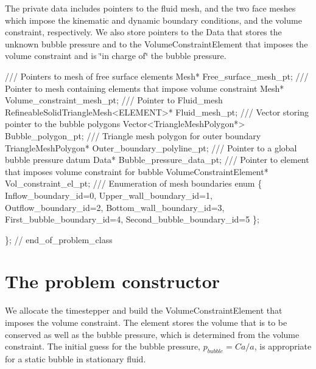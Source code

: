 The private data includes pointers to the fluid mesh, and the two face meshes which impose the kinematic and dynamic boundary conditions, and the volume constraint, respectively. We also store pointers to the Data that stores the unknown bubble pressure and to the {\ttfamily Volume\+Constraint\+Element} that imposes the volume constraint and is \char`\"{}in charge of\char`\"{} the bubble pressure.


\begin{DoxyCodeInclude}
 \textcolor{comment}{/// Pointers to mesh of free surface elements}
 Mesh* Free\_surface\_mesh\_pt;
 \textcolor{comment}{}
\textcolor{comment}{ /// Pointer to mesh containing elements that impose volume constraint}
\textcolor{comment}{} Mesh* Volume\_constraint\_mesh\_pt;
\textcolor{comment}{}
\textcolor{comment}{ /// Pointer to Fluid\_mesh}
\textcolor{comment}{} RefineableSolidTriangleMesh<ELEMENT>* Fluid\_mesh\_pt;
 \textcolor{comment}{}
\textcolor{comment}{ /// Vector storing pointer to the bubble polygons}
\textcolor{comment}{} Vector<TriangleMeshPolygon*> Bubble\_polygon\_pt;
\textcolor{comment}{}
\textcolor{comment}{ /// Triangle mesh polygon for outer boundary }
\textcolor{comment}{} TriangleMeshPolygon* Outer\_boundary\_polyline\_pt; 
\textcolor{comment}{}
\textcolor{comment}{ /// Pointer to a global bubble pressure datum}
\textcolor{comment}{} Data* Bubble\_pressure\_data\_pt;
\textcolor{comment}{}
\textcolor{comment}{ /// Pointer to element that imposes volume constraint for bubble}
\textcolor{comment}{} VolumeConstraintElement* Vol\_constraint\_el\_pt;
 \textcolor{comment}{}
\textcolor{comment}{ /// Enumeration of mesh boundaries}
\textcolor{comment}{} \textcolor{keyword}{enum} 
 \{
  Inflow\_boundary\_id=0,
  Upper\_wall\_boundary\_id=1,
  Outflow\_boundary\_id=2,
  Bottom\_wall\_boundary\_id=3,
  First\_bubble\_boundary\_id=4,
  Second\_bubble\_boundary\_id=5
 \};
 

\}; \textcolor{comment}{// end\_of\_problem\_class}

\end{DoxyCodeInclude}




 

\hypertarget{index_constructor}{}\section{The problem constructor}\label{index_constructor}
We allocate the timestepper and build the {\ttfamily Volume\+Constraint\+Element} that imposes the volume constraint. The element stores the volume that is to be conserved as well as the bubble pressure, which is determined from the volume constraint. The initial guess for the bubble pressure, $ p_{bubble}=Ca/a $, is appropriate for a static bubble in stationary fluid.


